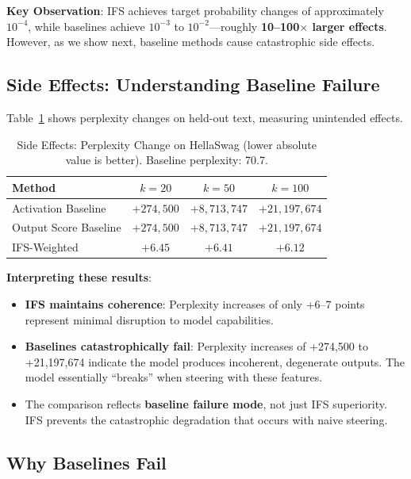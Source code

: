 \documentclass{article}
\begin{document}
\textbf{Key Observation}: IFS achieves target probability changes of approximately $10^{-4}$, while baselines achieve $10^{-3}$ to $10^{-2}$---roughly \textbf{10--100$\times$ larger effects}. However, as we show next, baseline methods cause catastrophic side effects.

\subsection{Side Effects: Understanding Baseline Failure}
\label{sec:side_effects}

Table~\ref{tab:side_effects} shows perplexity changes on held-out text, measuring unintended effects.

\begin{table}[t]
\caption{Side Effects: Perplexity Change on HellaSwag (lower absolute value is better). Baseline perplexity: 70.7.}
\label{tab:side_effects}
\centering
\begin{tabular}{lccc}
\toprule
Method & $k=20$ & $k=50$ & $k=100$ \\
\midrule
Activation Baseline & $+274{,}500$ & $+8{,}713{,}747$ & $+21{,}197{,}674$ \\
Output Score Baseline & $+274{,}500$ & $+8{,}713{,}747$ & $+21{,}197{,}674$ \\
IFS-Weighted & $\mathbf{+6.45}$ & $\mathbf{+6.41}$ & $\mathbf{+6.12}$ \\
\bottomrule
\end{tabular}
\end{table}

\textbf{Interpreting these results}:
\begin{itemize}
    \item \textbf{IFS maintains coherence}: Perplexity increases of only +6--7 points represent minimal disruption to model capabilities.
    \item \textbf{Baselines catastrophically fail}: Perplexity increases of +274,500 to +21,197,674 indicate the model produces incoherent, degenerate outputs. The model essentially ``breaks'' when steering with these features.
    \item The comparison reflects \textbf{baseline failure mode}, not just IFS superiority. IFS prevents the catastrophic degradation that occurs with naive steering.
\end{itemize}

\subsection{Why Baselines Fail}
\end{document}
